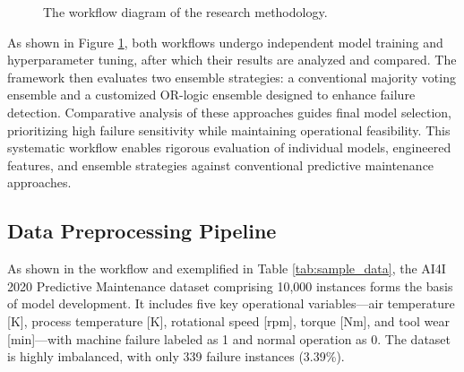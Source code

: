 \documentclass[final,5p, twocolumn]{elsarticle}
\begin{document}
\begin{figure}[!htb]
\caption{The workflow diagram of the research methodology.}
\label{fig:workflow}
\end{figure}

As shown in Figure \ref{fig:workflow}, both workflows undergo independent model training and hyperparameter tuning, after which their results are analyzed and compared. The framework then evaluates two ensemble strategies: a conventional majority voting ensemble and a customized OR-logic ensemble designed to enhance failure detection. Comparative analysis of these approaches guides final model selection, prioritizing high failure sensitivity while maintaining operational feasibility. This systematic workflow enables rigorous evaluation of individual models, engineered features, and ensemble strategies against conventional predictive maintenance approaches.

\subsection{Data Preprocessing Pipeline}

As shown in the workflow and exemplified in Table \ref{tab:sample_data}, the AI4I 2020 Predictive Maintenance dataset comprising 10,000 instances forms the basis of model development. It includes five key operational variables—air temperature [K], process temperature [K], rotational speed [rpm], torque [Nm], and tool wear [min]—with machine failure labeled as 1 and normal operation as 0. The dataset is highly imbalanced, with only 339 failure instances (3.39\%).
\end{document}
